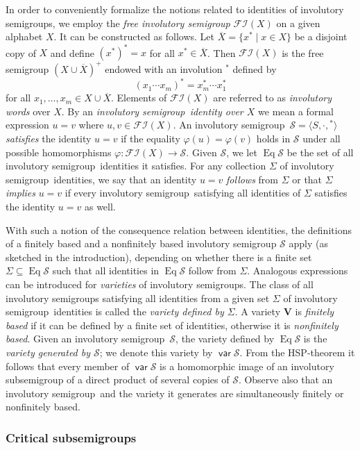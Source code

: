 \documentclass[preprint,1p,times]{elsarticle}
\DeclareMathOperator{\var}{\mathsf{var}}
\DeclareMathOperator{\Id}{Eq}
\numberwithin{equation}{section}
\theoremstyle{remark}
\def\cal{\mathcal}
\def\Sc{{\cal S}}
\def\Vc{\mathbf{V}}
\def\Si{\Sigma}
\def\sm{semi\-group}
\def\FI{\ensuremath{\mathcal{FI}}}
\begin{document}
In order to conveniently formalize the notions related to identities of involutory semigroups, we employ the \emph{free
involutory semigroup} $\FI(X)$ on a given alphabet $X$. It can be constructed as follows.  Let $\overline{X}=\{x^*\mid
x\in X\}$ be a disjoint copy of $X$ and define $(x^*)^*=x$ for all $x^*\in \overline{X}$. Then $\FI(X)$ is the free
semigroup $(X\cup\overline{X})^+$ endowed with an involution ${}^*$ defined by
$$(x_1\cdots x_m)^* = x_m^*\cdots x_1^*$$
for all $x_1,\dots,x_m\in X\cup \overline{X}$. Elements of $\FI(X)$ are referred to as \emph{involutory words} over
$X$. By an \emph{involutory \sm\ identity over $X$} we mean a formal expression $u=v$ where $u,v\in\FI(X)$. An
involutory \sm\ $\mathcal{S}=\langle S,\cdot,{}^*\rangle$ \emph{satisfies} the identity $u=v$ if the equality
$\varphi(u)=\varphi(v)$ holds in $\mathcal{S}$ under all possible homomorphisms $\varphi:\FI(X) \to\mathcal{S}$. Given
$\mathcal{S}$, we let {$\Id \mathcal{S}$ be} the set of all involutory \sm\ identities it satisfies. For any collection
$\Sigma$ of involutory \sm\ identities, we say that an identity $u=v$ \emph{follows} from $\Sigma$ or that $\Sigma$
\emph{implies} $u=v$ if every involutory \sm\ satisfying all identities of $\Sigma$ satisfies the identity $u=v$ as
well.

With such a {notion} of the consequence relation between identities, the {definitions} of a finitely based and a
nonfinitely based involutory semigroup $\mathcal{S}$ apply (as sketched in the introduction), depending on whether
there is a finite set $\Si\subseteq\Id \mathcal{S}$ such that all identities in $\Id \mathcal{S}$ follow from $\Si$.
Analogous expressions can be introduced for \emph{varieties} of involutory semigroups. The class of all involutory
semigroups satisfying all identities from a given set $\Sigma$ of involutory \sm\ identities is called the
\emph{variety defined by $\Sigma$}. A variety $\Vc$ is \emph{finitely based} if it can be defined by a finite set of
identities, otherwise it is \emph{nonfinitely based}. Given an involutory \sm\ $\mathcal{S}$, the variety defined by
$\Id\Sc$ is the \emph{variety generated by $\Sc$}; we denote this variety by $\var\Sc$. From the HSP-theorem it follows
that every member of $\var\Sc$ is a homomorphic image of an involutory subsemigroup of a direct product of several
copies of $\Sc$. Observe also that an involutory \sm\ and the variety it generates are simultaneously finitely or
nonfinitely based.

\subsubsection{Critical subsemigroups}\label{critical}
\end{document}
